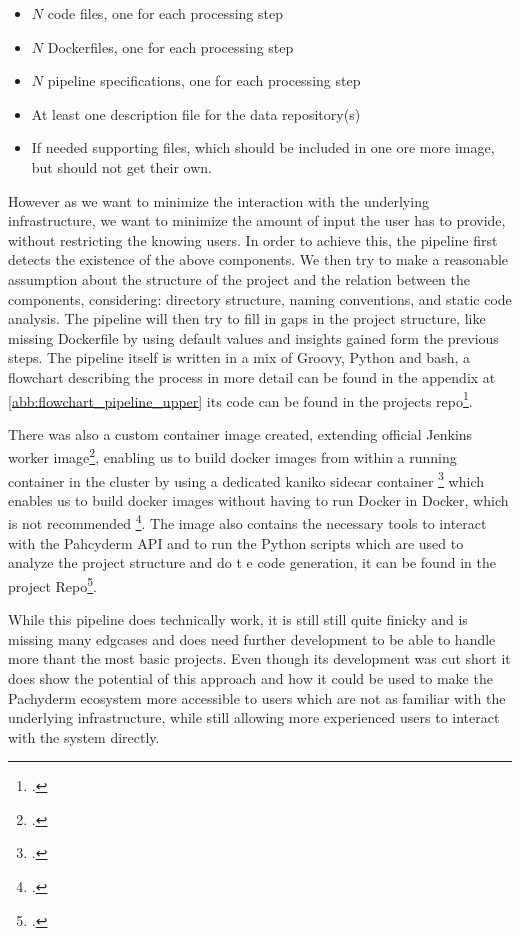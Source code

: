 \begin{itemize}
    \item $N$ code files, one for each processing step
    \item $N$ Dockerfiles, one for each processing step
    \item $N$ pipeline specifications, one for each processing step
    \item At least one description file for the data repository(s)
    \item If needed supporting files, which should be included in one ore more image, but should not get their own.
\end{itemize}

However as we want to minimize the interaction with the underlying infrastructure, we want to minimize the amount of input the user has to provide, without restricting the knowing users.
In order to achieve this, the pipeline first detects the existence of the above components.
We then try to make a reasonable assumption about the structure of the project and the relation between the components, considering: directory structure, naming conventions, and static code analysis.
The pipeline will then try to fill in gaps in the project structure, like missing Dockerfile by using default values and insights gained form the previous steps.
The pipeline itself is written in a mix of Groovy, Python and bash, a flowchart describing the process in more detail can be found in the appendix at \ref{abb:flowchart_pipeline_upper} its code can be found in the projects repo\footcite{Pipeline}.

There was also a custom container image created, extending official Jenkins worker image\footcite{JenkinsJenkinsDocker}, enabling us to build docker images from within a running container in the cluster by using a dedicated kaniko 
sidecar container \footcite{KanikoBuildImages2023} which enables us to build docker images without having to run Docker in Docker, which is not recommended \footcite{UsingDockerinDockerYour}.
The image also contains the necessary tools to interact with the Pahcyderm API and to run the Python scripts which are used to analyze the project structure and do t   e code generation, it can be found in the project Repo\footcite{PipelineImage}.

While this pipeline does technically work, it is still still quite finicky and is missing many edgcases and does need further development to be able to handle more thant the most basic projects.
Even though its development was cut short it does show the potential of this approach and how it could be used to make the Pachyderm ecosystem more accessible to users which are not as familiar with the underlying infrastructure, 
while still allowing more experienced users to interact with the system directly.